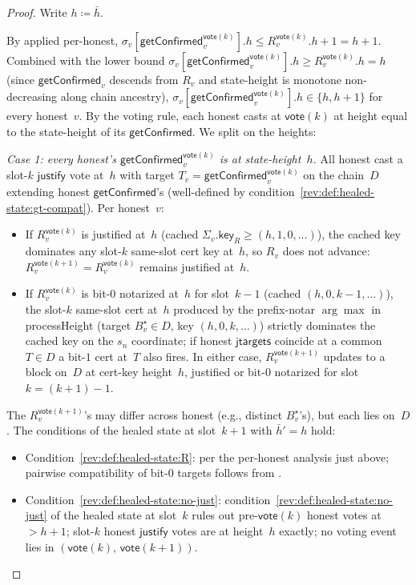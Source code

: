 \documentclass{article}
\newcommand{\just}{\ensuremath{\mathsf{justify}}\xspace}
\newcommand{\jtargets}{\mathsf{jtargets}}
\newcommand{\key}{\mathsf{key}}
\newcommand{\vote}{\mathsf{vote}}
\newcommand{\comm}[1]{\bar{#1}}
\newcommand{\processHeight}{\textsf{processHeight}\xspace}
\newcommand{\getConfirmed}{\textsf{getConfirmed}\xspace}
\theoremstyle{plain}
\theoremstyle{definition}
\theoremstyle{remark}
\begin{document}
\begin{proof}
Write $h \coloneqq \comm{h}$.

By  applied per-honest, $\sigma_v[\getConfirmed_v^{\vote(k)}].h \leq R_v^{\vote(k)}.h + 1 = h + 1$. Combined with the lower bound $\sigma_v[\getConfirmed_v^{\vote(k)}].h \geq R_v^{\vote(k)}.h = h$ (since $\getConfirmed_v$ descends from $R_v$ and state-height is monotone non-decreasing along chain ancestry), $\sigma_v[\getConfirmed_v^{\vote(k)}].h \in \{h, h+1\}$ for every honest~$v$. By the voting rule, each honest casts at $\vote(k)$ at height equal to the state-height of its $\getConfirmed$. We split on the heights:

\emph{Case 1: every honest's $\getConfirmed_v^{\vote(k)}$ is at state-height~$h$.}
All honest cast a slot-$k$ \just vote at~$h$ with target $T_v = \getConfirmed_v^{\vote(k)}$ on the chain~$D$ extending honest $\getConfirmed$'s (well-defined by condition~\ref{rev:def:healed-state:gt-compat}). Per honest~$v$:
\begin{itemize}
  \item If $R_v^{\vote(k)}$ is justified at~$h$ (cached $\Sigma_v.\key_R \geq (h, 1, 0, \ldots)$), the cached key dominates any slot-$k$ same-slot cert key at~$h$, so $R_v$ does not advance: $R_v^{\vote(k+1)} = R_v^{\vote(k)}$ remains justified at~$h$.
  \item If $R_v^{\vote(k)}$ is bit-$0$ notarized at~$h$ for slot~$k-1$ (cached $(h, 0, k-1, \ldots)$), the slot-$k$ same-slot cert at~$h$ produced by the prefix-notar $\arg\max$ in \processHeight{} (target $B^\star_v \in D$, key $(h, 0, k, \ldots)$) strictly dominates the cached key on the $s_n$ coordinate; if honest $\jtargets$ coincide at a common $T \in D$ a bit-$1$ cert at~$T$ also fires. In either case, $R_v^{\vote(k+1)}$ updates to a block on~$D$ at cert-key height~$h$, justified or bit-$0$ notarized for slot~$k = (k+1)-1$.
\end{itemize}
The $R_v^{\vote(k+1)}$'s may differ across honest (e.g., distinct $B^\star_v$'s), but each lies on~$D$. The conditions of the healed state at slot~$k+1$ with $\comm{h}' = h$ hold:
\begin{itemize}
  \item Condition~\ref{rev:def:healed-state:R}: per the per-honest analysis just above; pairwise compatibility of bit-$0$ targets follows from .
  \item Condition~\ref{rev:def:healed-state:no-just}: condition~\ref{rev:def:healed-state:no-just} of the healed state at slot~$k$ rules out pre-$\vote(k)$ honest votes at~$>h+1$; slot-$k$ honest \just votes are at height~$h$ exactly; no voting event lies in $(\vote(k),\, \vote(k+1))$.

\end{itemize}
\end{proof}
\end{document}

